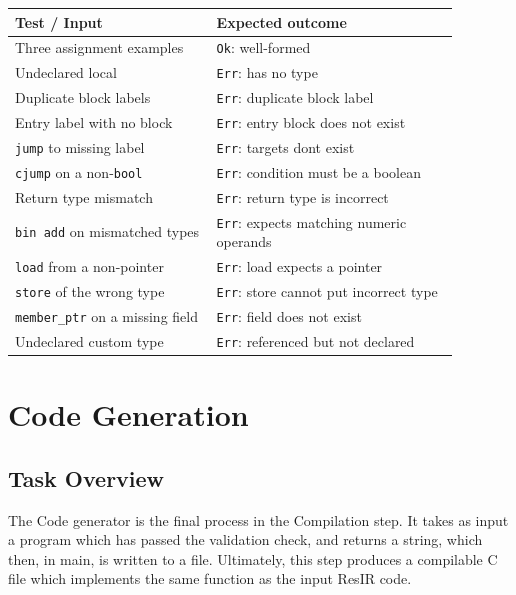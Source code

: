 \documentclass[11pt,a4paper,oneside]{report}
\begin{document}
	\begin{longtable}{p{0.40\linewidth}p{0.48\linewidth}}
		\toprule
		\textbf{Test / Input} & \textbf{Expected outcome} \\
		\midrule
		\endhead
		Three assignment examples        & \texttt{Ok}: well-formed \\
		\midrule
		Undeclared local                 & \texttt{Err}: has no type \\
		\midrule
		Duplicate block labels           & \texttt{Err}: duplicate block label \\
		\midrule
		Entry label with no block        & \texttt{Err}: entry block does not exist \\
		\midrule
		\texttt{jump} to missing label    & \texttt{Err}: targets dont exist \\
		\midrule
		\texttt{cjump} on a non-\texttt{bool} & \texttt{Err}: condition must be a boolean \\
		\midrule
		Return type mismatch             & \texttt{Err}: return type is incorrect \\
		\midrule
		\texttt{bin add} on mismatched types & \texttt{Err}: expects matching numeric operands \\
		\midrule
		\texttt{load} from a non-pointer  & \texttt{Err}: load expects a pointer \\
		\midrule
		\texttt{store} of the wrong type  & \texttt{Err}: store cannot put incorrect type \\
		\midrule
		\texttt{member\_ptr} on a missing field & \texttt{Err}: field does not exist \\
		\midrule
		Undeclared custom type           & \texttt{Err}: referenced but not declared \\
		\bottomrule
	\end{longtable}
	
	\chapter{Code Generation}
	
	\section{Task Overview}
	The Code generator is the final process in the Compilation step. It takes as input a program which has passed the validation check, and returns a string, which then, in main, is written to a file. Ultimately, this step produces a compilable C file which implements the same function as the input ResIR code. 
	
\end{document}
